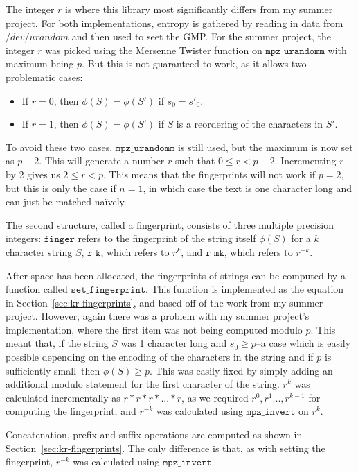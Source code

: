 \documentclass[ %
                    author={Dominic Joseph Moylett},
                    degree={MEng},
                     title={Dictionary Matching with Fingerprints},
                  subtitle={An Empirical Analysis},
                      type={Research},
                      year={2014} ]{dissertation}
\begin{document}
The integer $r$ is where this library most significantly differs from my summer project. For both implementations, entropy is gathered by reading in data from $/dev/urandom$ and then used to seet the GMP. For the summer project, the integer $r$ was picked using the Mersenne Twister function on $\texttt{mpz\_urandomm}$ with maximum being $p$. But this is not guaranteed to work, as it allows two problematic cases:

\begin{itemize}
  \item If $r = 0$, then $\phi(S) = \phi(S')$ if $s_0 = s'_0$.
  \item If $r = 1$, then $\phi(S) = \phi(S')$ if $S$ is a reordering of the characters in $S'$.
\end{itemize}

To avoid these two cases, $\texttt{mpz\_urandomm}$ is still used, but the maximum is now set as $p-2$. This will generate a number $r$ such that $0 \leq r < p-2$. Incrementing $r$ by 2 gives us $2 \leq r < p$. This means that the fingerprints will not work if $p = 2$, but this is only the case if $n = 1$, in which case the text is one character long and can just be matched na\"{i}vely.

The second structure, called a fingerprint, consists of three multiple precision integers: $\texttt{finger}$ refers to the fingerprint of the string itself $\phi(S)$ for a $k$ character string $S$, $\texttt{r\_k}$, which refers to $r^k$, and $\texttt{r\_mk}$, which refers to $r^{-k}$.

After space has been allocated, the fingerprints of strings can be computed by a function called $\texttt{set\_fingerprint}$. This function is implemented as the equation in Section~\ref{sec:kr-fingerprints}, and based off of the work from my summer project. However, again there was a problem with my summer project's implementation, where the first item was not being computed modulo $p$. This meant that, if the string $S$ was 1 character long and $s_0 \geq p$--a case which is easily possible depending on the encoding of the characters in the string and if $p$ is sufficiently small--then $\phi(S) \geq p$. This was easily fixed by simply adding an additional modulo statement for the first character of the string. $r^k$ was calculated incrementally as $r*r*r*...*r$, as we required $r^0,r^1...,r^{k-1}$ for computing the fingerprint, and $r^{-k}$ was calculated using $\texttt{mpz\_invert}$ on $r^k$.

Concatenation, prefix and suffix operations are computed as shown in Section~\ref{sec:kr-fingerprints}. The only difference is that, as with setting the fingerprint, $r^{-k}$ was calculated using $\texttt{mpz\_invert}$.
\end{document}
